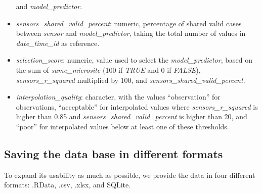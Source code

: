 \documentclass[]{article}
\begin{document}
\begin{itemize}
  and \emph{model\_predictor}.
\item
  \emph{sensors\_shared\_valid\_percent}: numeric, percentage of shared
  valid cases between \emph{sensor} and \emph{model\_predictor}, taking
  the total number of values in \emph{date\_time\_id} as reference.
\item
  \emph{selection\_score}: numeric, value used to select the
  \emph{model\_predictor}, based on the sum of \emph{same\_microsite}
  (100 if \emph{TRUE} and 0 if \emph{FALSE}), \emph{sensors\_r\_squared}
  multiplied by 100, and \emph{sensors\_shared\_valid\_percent}.
\item
  \emph{interpolation\_quality}: character, with the values
  ``observation'' for observations, ``acceptable'' for interpolated
  values where \emph{sensors\_r\_squared} is higher than 0.85 and
  \emph{sensors\_shared\_valid\_percent} is higher than 20, and ``poor''
  for interpolated values below at least one of these thresholds.
\end{itemize}

\hypertarget{saving-the-data-base-in-different-formats}{%
\subsection{Saving the data base in different
formats}\label{saving-the-data-base-in-different-formats}}

To expand its usability as much as possible, we provide the data in four
different formats: .RData, .csv, .xlsx, and SQLite.
\end{document}
